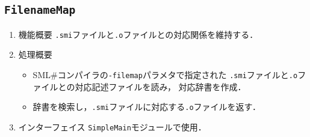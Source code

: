 \documentclass{jbook}
\newcommand{\smlsharp}{SML\#}
\newcommand{\code}[1]{\mbox{\large\tt #1}}
\begin{document}
\subsection{\code{FilenameMap}}
\begin{enumerate}
\item 機能概要 \code{.smi}ファイルと\code{.o}ファイルとの対応関係を維持する．
\item 処理概要 
\begin{itemize}
\item \smlsharp{}コンパイラの\code{-filemap}パラメタで指定された
\code{.smi}ファイルと\code{.o}ファイルとの対応記述ファイルを読み，
対応辞書を作成．
\item 辞書を検索し，\code{.smi}ファイルに対応する\code{.o}ファイルを返す．
\end{itemize}
\item インターフェイス \code{SimpleMain}モジュールで使用．
\end{enumerate}
\end{document}
